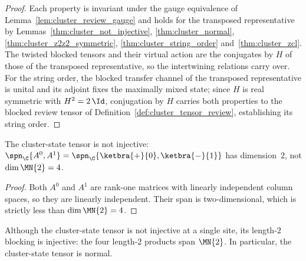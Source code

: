 \begin{proof}
    \leanok
    Each property is invariant under the gauge equivalence of
    Lemma~\ref{lem:cluster_review_gauge} and holds for the transposed
    representative by Lemmas~\ref{thm:cluster_not_injective},
    \ref{thm:cluster_normal}, \ref{thm:cluster_z2z2_symmetric},
    \ref{thm:cluster_string_order} and~\ref{thm:cluster_zcl}. The twisted
    blocked tensors and their virtual action are the conjugates by $H$ of
    those of the transposed representative, so the intertwining relations
    carry over. For the string order, the blocked transfer channel of the
    transposed representative is unital and its adjoint fixes the maximally
    mixed state; since $H$ is real symmetric with $H^2 = 2\,\Id$, conjugation
    by $H$ carries both properties to the blocked review tensor of
    Definition~\ref{def:cluster_tensor_review}, establishing its string order.
\end{proof}

\begin{lemma}\label{thm:cluster_not_injective}
    \leanok
    The cluster-state tensor is not injective:
    $\spn_{\C}\{A^0, A^1\} = \spn_{\C}\{\ketbra{+}{0}, \ketbra{-}{1}\}$
    has dimension~$2$, not $\dim \MN{2} = 4$.
\end{lemma}

\begin{proof}
    \leanok
    Both $A^0$ and $A^1$ are rank-one matrices with linearly
    independent column spaces, so they are linearly independent.
    Their span is two-dimensional, which is strictly less than
    $\dim \MN{2} = 4$.
\end{proof}

\begin{lemma}\label{thm:cluster_normal}
    \leanok
    Although the cluster-state tensor is not injective at a single site, its
    length-$2$ blocking is injective: the four length-$2$ products span
    $\MN{2}$. In particular, the cluster-state tensor is normal.
\end{lemma}

